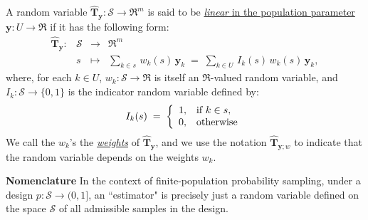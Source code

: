 \documentclass{article}
\begin{document}
\begin{definition}
\mbox{}
\vskip 0.1cm
\noindent
A random variable $\widehat{\mathbf{T}}_{\mathbf{y}} : \mathcal{S} \longrightarrow \Re^{m}$
is said to be \underline{\emph{linear} in the population parameter $\mathbf{y} : U \longrightarrow \Re$}
if it has the following form:
\begin{equation*}
\begin{array}{cccl}
\widehat{\mathbf{T}}_{\mathbf{y}} : & \mathcal{S} & \longrightarrow & \Re^{m} \\
     & s &\longmapsto & \underset{k\in s}{\sum}\,w_{k}(s)\,\mathbf{y}_{k} \;=\; \underset{k\in U}{\sum}\,I_{k}(s)\,w_{k}(s)\,\mathbf{y}_{k},
\end{array}
\end{equation*}
where, for each $k \in U$, $w_{k} : \mathcal{S} \longrightarrow \Re$ is itself
an $\Re$-valued random variable, and $I_{k} : \mathcal{S} \longrightarrow \{0,1\}$
is the indicator random variable defined by:
\begin{equation*}
I_{k}(s)
\;=\;
\left\{
\begin{array}{cl}
1, & \textnormal{if $k \in s$}, \\
0, & \textnormal{otherwise}
\end{array}
\right.
\end{equation*}
We call the $w_{k}$'s the \underline{\emph{weights}} of $\widehat{\mathbf{T}}_{\mathbf{y}}$,
and we use the notation $\widehat{\mathbf{T}}_{\mathbf{y};w}$ to indicate that the random
variable depends on the weights $w_{k}$.
\end{definition}

\noindent
\textbf{Nomenclature}
\;
In the context of finite-population probability sampling, under a design
$p : \mathcal{S} \longrightarrow (0,1]$,
an ``estimator" is precisely just a random variable defined on the space
$\mathcal{S}$ of all admissible samples in the design.
\end{document}
